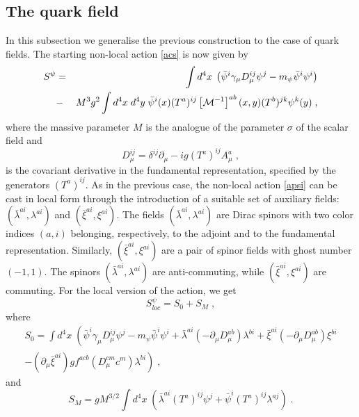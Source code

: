 \subsection{The quark field} 
In this subsection we generalise the previous construction to the case of quark fields. The  starting non-local action \eqref{acs} is now given by 
\begin{eqnarray}
\label{apsi}
S^{\psi} &=& \int d^4x\; \left( {\bar \psi}^{i} \gamma_\mu D_{\mu}^{ij} \psi^{j} - m_{\psi}  {\bar \psi}^{i} \psi^{i}  \right) 
 \nonumber \\
 &-&
 M^3 g^2   \int d^{4}x\;d^{4}y\;   {\bar \psi}^{i}(x)  (T^a)^{ij} \left[ {\cal M}^{-1}\right]^{ab} (x,y)  (T^b)^{jk} \psi^{k}(y) \;, 
\end{eqnarray}
where the massive parameter $M$ is the analogue of the parameter $\sigma$ of the scalar field and 
\begin{equation}
D^{ij}_\mu = \delta^{ij} \partial_\mu - i g  (T^a)^{ij} A^a_\mu \;, \label{covf}
\end{equation}
is the covariant derivative in the fundamental representation, specified by the generators $(T^a)^{ij}$. As in the previous case, the non-local action \eqref{apsi} can be cast in local form through the introduction of a suitable set of auxiliary fields: $({\bar \lambda}^{ai}, {\lambda}^{ai})$ and $({\bar \xi}^{ai}, {\xi}^{ai})$. The fields $({\bar \lambda}^{ai}, {\lambda}^{ai})$ are Dirac spinors  with two color indices $(a,i)$ belonging, respectively,  to the adjoint and to the  fundamental representation. Similarly, $({\bar \xi}^{ai}, {\xi}^{ai})$ are a pair of spinor fields with ghost number $(-1,1)$. The spinors  $({\bar \lambda}^{ai}, {\lambda}^{ai})$ are anti-commuting, while $({\bar \xi}^{ai}, {\xi}^{ai})$ are commuting. For the local version of the action, we get 
\begin{equation}
S^{\psi}_{loc} = S_0 + S_M \;, \label{locpsi}
\end{equation}
where 
\begin{eqnarray}
S_0  =  \int d^4x\; \left( {\bar \psi}^{i} \gamma_\mu D_{\mu}^{ij} \psi^{j} - m_{\psi}  {\bar \psi}^{i} \psi^{i}   +  {\bar \lambda}^{ai}( -\partial_\mu D^{ab}_\mu) \lambda^{bi} 
+ {\bar \xi}^{ai}( -\partial_\mu D^{ab}_{\mu} ) \xi^{bi}  \right.
\nonumber \\
\left. -(\partial_\mu {\bar \xi}^{ai}) g f^{acb} (D^{cm}_\mu c^m) \lambda^{bi}  \right)  \;, \label{szpsi}
\end{eqnarray}
and 
\begin{equation}
S_M = g M^{3/2} \int d^4x \; \left(   {\bar \lambda}^{ai} (T^a)^{ij} \psi^{j} +  {\bar \psi}^{i} (T^a)^{ij} \lambda^{aj}    \right)    \;. \label{sM}
\end{equation}
